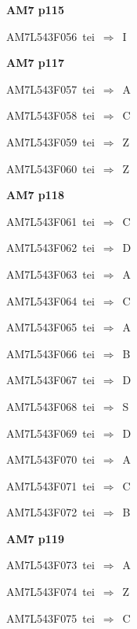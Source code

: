 \par\vfill\eject
{\bf\hfill AM7 p115\hfill\hbox{}}\par\bigskip
{\sixrm AM7L543F056\ {\sixit tei}\ }$\Rightarrow$\ I\par\smallskip

\par\vfill\eject
{\bf\hfill AM7 p117\hfill\hbox{}}\par\bigskip
{\sixrm AM7L543F057\ {\sixit tei}\ }$\Rightarrow$\ A\par\smallskip
{\sixrm AM7L543F058\ {\sixit tei}\ }$\Rightarrow$\ C\par\smallskip
{\sixrm AM7L543F059\ {\sixit tei}\ }$\Rightarrow$\ Z\par\smallskip
{\sixrm AM7L543F060\ {\sixit tei}\ }$\Rightarrow$\ Z\par\smallskip

\par\vfill\eject
{\bf\hfill AM7 p118\hfill\hbox{}}\par\bigskip
{\sixrm AM7L543F061\ {\sixit tei}\ }$\Rightarrow$\ C\par\smallskip
{\sixrm AM7L543F062\ {\sixit tei}\ }$\Rightarrow$\ D\par\smallskip
{\sixrm AM7L543F063\ {\sixit tei}\ }$\Rightarrow$\ A\par\smallskip
{\sixrm AM7L543F064\ {\sixit tei}\ }$\Rightarrow$\ C\par\smallskip
{\sixrm AM7L543F065\ {\sixit tei}\ }$\Rightarrow$\ A\par\smallskip
{\sixrm AM7L543F066\ {\sixit tei}\ }$\Rightarrow$\ B\par\smallskip
{\sixrm AM7L543F067\ {\sixit tei}\ }$\Rightarrow$\ D\par\smallskip
{\sixrm AM7L543F068\ {\sixit tei}\ }$\Rightarrow$\ S\par\smallskip
{\sixrm AM7L543F069\ {\sixit tei}\ }$\Rightarrow$\ D\par\smallskip
{\sixrm AM7L543F070\ {\sixit tei}\ }$\Rightarrow$\ A\par\smallskip
{\sixrm AM7L543F071\ {\sixit tei}\ }$\Rightarrow$\ C\par\smallskip
{\sixrm AM7L543F072\ {\sixit tei}\ }$\Rightarrow$\ B\par\smallskip

\par\vfill\eject
{\bf\hfill AM7 p119\hfill\hbox{}}\par\bigskip
{\sixrm AM7L543F073\ {\sixit tei}\ }$\Rightarrow$\ A\par\smallskip
{\sixrm AM7L543F074\ {\sixit tei}\ }$\Rightarrow$\ Z\par\smallskip
{\sixrm AM7L543F075\ {\sixit tei}\ }$\Rightarrow$\ C\par\smallskip

